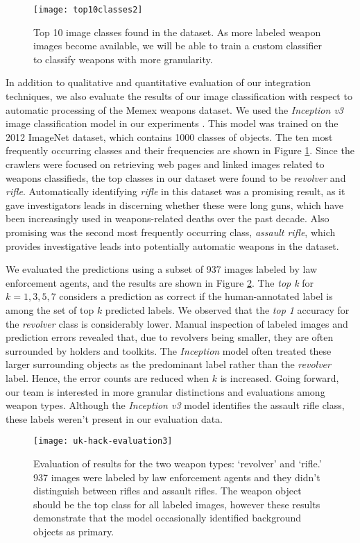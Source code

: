 \begin{figure}
	\texttt{[image: top10classes2]}
	\caption{Top 10 image classes found in the dataset. As more labeled weapon images become available, we will be able to train a custom classifier to classify weapons with more granularity.}
	\label{fig:top10ImgClass}
\end{figure}


In addition to qualitative and quantitative evaluation of our integration techniques, we also evaluate the results of our image classification with respect to automatic processing of the Memex weapons dataset.  We used the \textit{Inception v3} image classification model in our experiments \cite{SzegedyVISW15}. This model was trained on the 2012 ImageNet dataset, which contains 1000 classes of objects\cite{ILSVRC15}. The ten most frequently occurring classes and their frequencies are shown in Figure \ref{fig:top10ImgClass}. Since the crawlers were focused on retrieving web pages and linked images related to weapons classifieds, the top classes in our dataset were found to be \textit{revolver} and \textit{rifle}. Automatically identifying \textit{rifle} in this dataset was a promising result, as it gave investigators leads in discerning whether these were long guns, which have been increasingly used in weapons-related deaths over the past decade. Also promising was the second most frequently occurring class, \textit{assault rifle}, which provides investigative leads into potentially automatic weapons in the dataset.

We evaluated the predictions using a subset of 937 images labeled by law enforcement agents, and the results are shown in Figure \ref{fig:uk-hack-eval}. The \textit{top k} for $k=1,3,5,7$ considers a prediction as correct if the human-annotated label is among the set of top $k$  predicted labels. We observed that the \textit{top 1} accuracy for the \textit{revolver} class is considerably lower. Manual inspection of labeled images and prediction errors revealed that, due to revolvers being smaller, they are often surrounded by holders and toolkits. The \textit{Inception} model often treated these larger surrounding objects as the predominant label rather than the \textit{revolver} label. Hence, the error counts are reduced when $k$ is increased. Going forward, our team is interested in more granular distinctions and evaluations among weapon types. Although the \textit{Inception v3} model identifies the assault rifle class, these labels weren't present in our evaluation data. 

\begin{figure}
	\texttt{[image: uk-hack-evaluation3]}
	\caption{Evaluation of results for the two weapon types: `revolver' and `rifle.' 937 images were labeled by law enforcement agents and they didn't distinguish between rifles and assault rifles. The weapon object should be the top class for all labeled images, however these results demonstrate that the model occasionally identified background objects as primary.}
	\label{fig:uk-hack-eval}
\end{figure}

